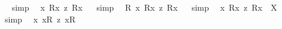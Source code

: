 \begin{isabellebody}
\isadelimproof
\ %
\endisadelimproof
%
\isatagproof
{}\isamarkupfalse%
\ simp\ \isamarkupfalse%
%
\endisatagproof
{\isafoldproof}%
%
\isadelimproof
%
\endisadelimproof
\isanewline
\isanewline
{}\isamarkupfalse%
\ {\isachardoublequoteopen}{\isacharbrackleft}{\isasymforall}{\isacharparenleft}{\isasymlambda}x{\isachardot}\ {\isacharless}R{}{\isasymbullet}{\isachardot}x{\isachardot}{\isachargreater}\ {\isasymrightarrow}\isactrlsup z\ {\isacharless}R{}{\isasymbullet}{\isachardot}x{\isachardot}{\isachargreater}{\isacharparenright}{\isacharbrackright}{\isachardoublequoteclose}%
\isadelimproof
\ %
\endisadelimproof
%
\isatagproof
{}\isamarkupfalse%
\ simp\ \isamarkupfalse%
%
\endisatagproof
{\isafoldproof}%
%
\isadelimproof
%
\endisadelimproof
\isanewline
{}\isamarkupfalse%
\ {\isachardoublequoteopen}{\isacharbrackleft}{\isasymforall}{\isacharparenleft}{\isasymlambda}R{\isachardot}\ {\isasymforall}{\isacharparenleft}{\isasymlambda}x{\isachardot}\ {\isacharless}{\isachardot}R{\isachardot}{\isasymbullet}{\isachardot}x{\isachardot}{\isachargreater}\ {\isasymrightarrow}\isactrlsup z\ {\isacharless}{\isachardot}R{\isachardot}{\isasymbullet}{\isachardot}x{\isachardot}{\isachargreater}{\isacharparenright}{\isacharparenright}{\isacharbrackright}{\isachardoublequoteclose}%
\isadelimproof
\ %
\endisadelimproof
%
\isatagproof
{}\isamarkupfalse%
\ simp\ \isamarkupfalse%
%
\endisatagproof
{\isafoldproof}%
%
\isadelimproof
%
\endisadelimproof
\isanewline
{}\isamarkupfalse%
\ {\isachardoublequoteopen}{\isasymforall}{\isacharparenleft}{\isasymlambda}x{\isachardot}\ {\isacharless}R{}{\isasymbullet}{\isachardot}x{\isachardot}{\isachargreater}\ {\isasymrightarrow}\isactrlsup z\ {\isacharless}R{}{\isasymbullet}{\isachardot}x{\isachardot}{\isachargreater}{\isacharparenright}\ {\isacharequal}\ X{\isachardoublequoteclose}%
\isadelimproof
\ %
\endisadelimproof
%
\isatagproof
{}\isamarkupfalse%
\ simp\ \isamarkupfalse%
%
\endisatagproof
{\isafoldproof}%
%
\isadelimproof
%
\endisadelimproof
\isanewline
\isanewline
{}\isamarkupfalse%
\ {\isachardoublequoteopen}{\isacharbrackleft}{\isasymforall}{\isacharparenleft}{\isasymlambda}x{\isachardot}\ {\isacharless}{\isachardot}x{\isachardot}{\isasymcirc}R{}{\isachargreater}\ {\isasymrightarrow}\isactrlsup z\ {\isacharless}{\isachardot}x{\isachardot}{\isasymcirc}R{}{\isachargreater}{\isacharparenright}{\isacharbrackright}{\isachardoublequoteclose}%

\end{isabellebody}
